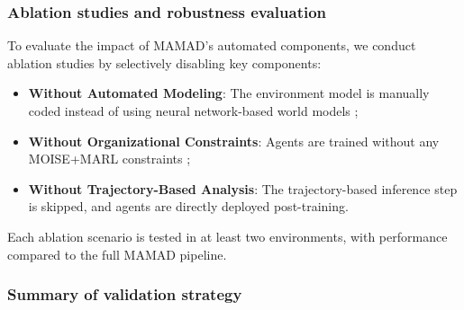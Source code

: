 \documentclass[journal]{IEEEtai}
\begin{document}
\subsubsection{Ablation studies and robustness evaluation}
To evaluate the impact of MAMAD's automated components, we conduct ablation studies by selectively disabling key components:
\begin{itemize}
    \item \textbf{Without Automated Modeling}: The environment model is manually coded instead of using neural network-based world models ;
    \item \textbf{Without Organizational Constraints}: Agents are trained without any MOISE+MARL constraints ;
    \item \textbf{Without Trajectory-Based Analysis}: The trajectory-based inference step is skipped, and agents are directly deployed post-training.
\end{itemize}

Each ablation scenario is tested in at least two environments, with performance compared to the full MAMAD pipeline.


\subsubsection{Summary of validation strategy}
\end{document}
